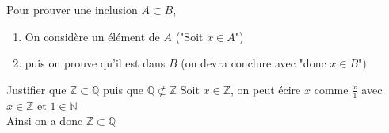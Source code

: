\documentclass[11pt]{article}
\newcommand*{\Q}{\mathbb{Q}}
\newcommand*{\Z}{\mathbb{Z}}
\newcommand*{\N}{\mathbb{N}}
\newcommand*{\n}{\\[0.2cm]}
\newcommand{\0}{\varnothing}
\begin{document}
\begin{meth*}{}{}
    Pour prouver une inclusion $A \subset B$,
    \begin{enumerate}
        \item On considère un élément de $A$ ("Soit $x \in A$")
        \item puis on prouve qu'il est dans $B$ (on devra conclure avec "donc $x \in B$")
    \end{enumerate}
\end{meth*}

\begin{ex}{}{}
    Justifier que $\Z \subset \Q$ puis que $\Q \not \subset \Z$
    \tcblower
    Soit $x \in \Z$, on peut écire $x$ comme $\frac{x}{1}$ avec $x \in \Z$ et $1 \in \N$\n
    Ainsi on a donc $\Z \subset \Q$
\end{ex}
\end{document}
